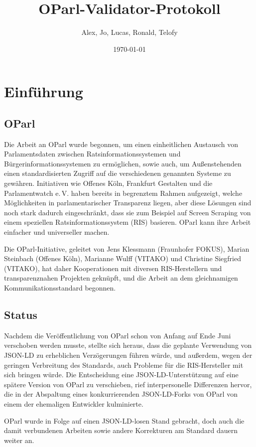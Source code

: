 \documentclass[12pt, fleqn]{scrartcl}
\title{OParl-Validator-Protokoll}
\author{Alex, Jo, Lucas, Ronald, Telofy}
\date{\today}
\begin{document}
\Maketitle

\section{Einführung}

\subsection{OParl}

Die Arbeit an OParl wurde begonnen, um einen einheitlichen Austausch von Parlamentsdaten zwischen Ratsinformationssystemen und Bürgerinformationssystemen zu ermöglichen, sowie auch, um Außenstehenden einen standardisierten Zugriff auf die verschiedenen genannten Systeme zu gewähren. Initiativen wie Offenes Köln, Frankfurt Gestalten und die Parlamentwatch e.\,V. haben bereits in begrenztem Rahmen aufgezeigt, welche Möglichkeiten in parlamentarischer Transparenz liegen, aber diese Lösungen sind noch stark dadurch eingeschränkt, dass sie zum Beispiel auf Screen Scraping von einem speziellen Ratsinformationssystem (RIS) basieren. OParl kann ihre Arbeit einfacher und universeller machen.

Die OParl-Initiative, geleitet von Jens Klessmann (Fraunhofer FOKUS), Marian Steinbach (Offenes Köln), Marianne Wulff (VITAKO) und Christine Siegfried (VITAKO), hat daher Kooperationen mit diversen RIS-Herstellern und transparenznahen Projekten geknüpft, und die Arbeit an dem gleichnamigen Kommunikationsstandard begonnen.

\subsection{Status}

Nachdem die Veröffentlichung von OParl schon von Anfang auf Ende Juni verschoben werden musste, stellte sich heraus, dass die geplante Verwendung von JSON-LD zu erheblichen Verzögerungen führen würde, und außerdem, wegen der geringen Verbreitung des Standards, auch Probleme für die RIS-Hersteller mit sich bringen würde. Die Entscheidung eine JSON-LD-Unterstützung auf eine spätere Version von OParl zu verschieben, rief interpersonelle Differenzen hervor, die in der Abspaltung eines konkurrierenden JSON-LD-Forks von OParl von einem der ehemaligen Entwickler kulminierte.

OParl wurde in Folge auf einen JSON-LD-losen Stand gebracht, doch auch die damit verbundenen Arbeiten sowie andere Korrekturen am Standard dauern weiter an.
\end{document}
